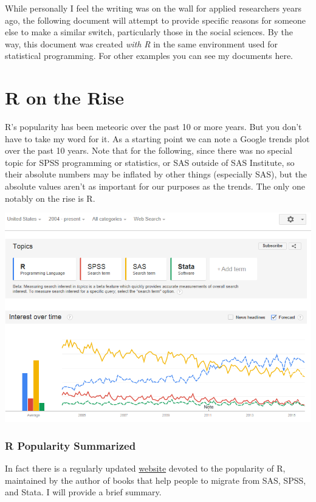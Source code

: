 \documentclass[english,nohyper,titlepage]{tufte-handout}\usepackage[]{graphicx}\usepackage[]{color}
\begin{document}
While personally I feel the writing was on the wall for applied researchers years ago, the following document will attempt to provide specific reasons for someone else to make a similar switch, particularly those in the social sciences.  By the way, this document was created \emph{with R} in the same environment used for statistical programming.  For other examples you can see my documents here. 

\pagebreak{}




\part{R on the Rise}
R's popularity has been meteoric over the past 10 or more years.  But you don't have to take my word for it.  As a starting point we can note a Google trends plot over the past 10 years.  Note that for the following, since there was no special topic for SPSS programming or statistics, or SAS outside of SAS Institute, so their absolute numbers may be inflated by other things (especially SAS), but the absolute values aren't as important for our purposes as the trends.  The only one notably on the rise is R.

\bigskip
\includegraphics[scale=.35]{trendssmall}
\bigskip


\section{R Popularity Summarized}
In fact there is a regularly updated \href{http://r4stats.com/articles/popularity/}{website} devoted to the popularity of R, maintained by the author of books that help people to migrate from SAS, SPSS, and Stata.  I will provide a brief summary.
\end{document}
